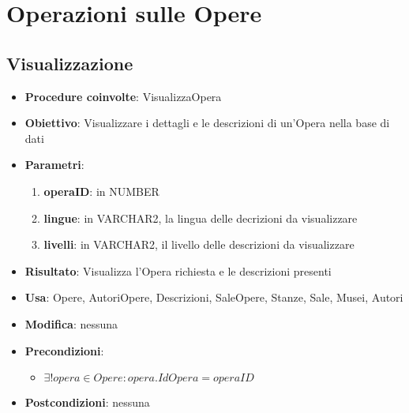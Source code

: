 \section{Operazioni sulle Opere}

\subsection{Visualizzazione}
\begin{itemize}
	\item \textbf{Procedure coinvolte}: VisualizzaOpera
	\item \textbf{Obiettivo}: Visualizzare i dettagli e le descrizioni di un'Opera nella base di dati
	\item \textbf{Parametri}:
	\begin{enumerate}
		\item \textbf{operaID}: in NUMBER
		\item \textbf{lingue}: in VARCHAR2, la lingua delle decrizioni da visualizzare
		\item \textbf{livelli}: in VARCHAR2, il livello delle descrizioni da visualizzare
	\end{enumerate}
	\item \textbf{Risultato}: Visualizza l'Opera richiesta e le descrizioni presenti
	\item \textbf{Usa}: Opere, AutoriOpere, Descrizioni, SaleOpere, Stanze, Sale, Musei, Autori
	\item \textbf{Modifica}: nessuna
	\item \textbf{Precondizioni}:
	\begin{itemize}
		\item $\exists! opera \in Opere : opera.IdOpera = operaID$
	\end{itemize}
	\item \textbf{Postcondizioni}: nessuna
\end{itemize}

